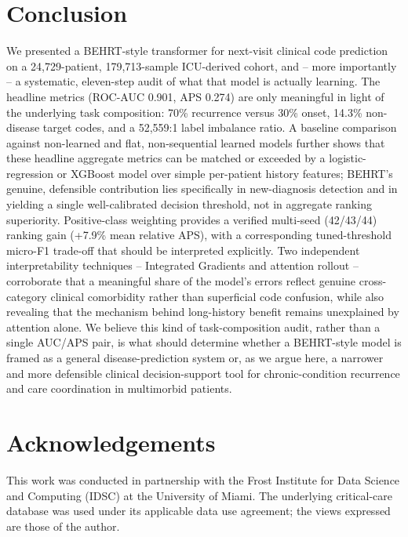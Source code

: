 \documentclass[11pt]{article}
\begin{document}
\section{Conclusion}

We presented a BEHRT-style transformer for next-visit clinical code
prediction on a 24{,}729-patient, 179{,}713-sample ICU-derived cohort, and --
more importantly -- a systematic, eleven-step audit of what that model is
actually learning. The headline metrics (ROC-AUC 0.901, APS 0.274) are only
meaningful in light of the underlying task composition: 70\% recurrence
versus 30\% onset, 14.3\% non-disease target codes, and a 52{,}559:1 label
imbalance ratio. A baseline comparison against non-learned and flat,
non-sequential learned models further shows that these headline aggregate
metrics can be matched or exceeded by a logistic-regression or XGBoost model
over simple per-patient history features; BEHRT's genuine, defensible
contribution lies specifically in new-diagnosis detection and in yielding a
single well-calibrated decision threshold, not in aggregate ranking
superiority. Positive-class weighting provides a verified multi-seed
(42/43/44) ranking gain (+7.9\% mean relative APS), with a corresponding
tuned-threshold micro-F1 trade-off that should be interpreted explicitly.
Two independent
interpretability techniques -- Integrated Gradients and attention rollout --
corroborate that a meaningful share of the model's errors reflect genuine
cross-category clinical comorbidity rather than superficial code confusion,
while also revealing that the mechanism behind long-history benefit remains
unexplained by attention alone. We believe this kind of task-composition
audit, rather than a single AUC/APS pair, is what should determine whether a
BEHRT-style model is framed as a general disease-prediction system or, as we
argue here, a narrower and more defensible clinical decision-support tool for
chronic-condition recurrence and care coordination in multimorbid patients.

\section*{Acknowledgements}

This work was conducted in partnership with the Frost Institute for Data
Science and Computing (IDSC) at the University of Miami. The underlying
critical-care database was used under its applicable data use agreement; the
views expressed are those of the author.
\end{document}
